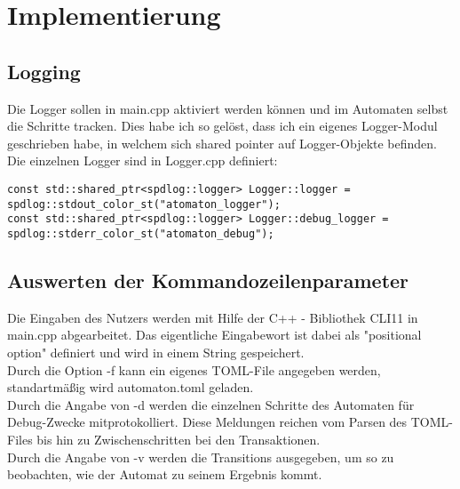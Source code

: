 \documentclass[12pt,a4paper]{article}
\begin{document}
\section{Implementierung}

\subsection{Logging}
Die Logger sollen in main.cpp aktiviert werden können und im Automaten selbst die Schritte tracken. Dies habe ich so gelöst, dass ich ein eigenes Logger-Modul geschrieben habe, in welchem sich shared pointer auf Logger-Objekte befinden.
\\
Die einzelnen Logger sind in Logger.cpp definiert:
\begin{lstlisting}
const std::shared_ptr<spdlog::logger> Logger::logger = 
spdlog::stdout_color_st("atomaton_logger");
const std::shared_ptr<spdlog::logger> Logger::debug_logger = 
spdlog::stderr_color_st("atomaton_debug");
\end{lstlisting}

\subsection{Auswerten der Kommandozeilenparameter}
Die Eingaben des Nutzers werden mit Hilfe der C++ - Bibliothek CLI11 in main.cpp abgearbeitet. Das eigentliche Eingabewort ist dabei als "positional option" definiert und wird in einem String gespeichert. 
\\
\medskip
Durch die Option -f kann ein eigenes TOML-File angegeben werden, standartmäßig wird automaton.toml geladen.
\\
\medskip
Durch die Angabe von -d werden die einzelnen Schritte des Automaten für Debug-Zwecke mitprotokolliert. Diese Meldungen reichen vom Parsen des TOML-Files bis hin zu Zwischenschritten bei den Transaktionen.
\\
\medskip
Durch die Angabe von -v werden die Transitions ausgegeben, um so zu beobachten, wie der Automat zu seinem Ergebnis kommt.
\end{document}
